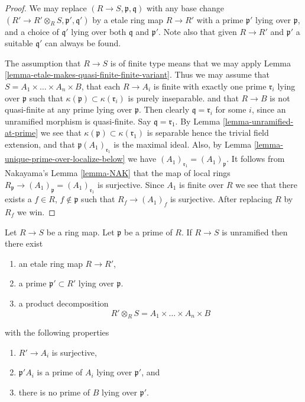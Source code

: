 \begin{proof}
We may replace $(R \to S, \mathfrak p, \mathfrak q)$
with any base change $(R' \to R'\otimes_R S, \mathfrak p', \mathfrak q')$
by a etale ring map $R \to R'$ with a prime $\mathfrak p'$
lying over $\mathfrak p$, and a choice of $\mathfrak q'$ lying over
both $\mathfrak q$ and $\mathfrak p'$. Note also that given
$R \to R'$ and $\mathfrak p'$ a suitable $\mathfrak q'$ can always
be found.

\medskip\noindent
The assumption that $R \to S$ is of finite type means that we may apply
Lemma \ref{lemma-etale-makes-quasi-finite-finite-variant}. Thus we may
assume that $S = A_1 \times \ldots \times A_n \times B$, that
each $R \to A_i$ is finite with exactly one prime $\mathfrak r_i$
lying over $\mathfrak p$ such that
$\kappa(\mathfrak p) \subset \kappa(\mathfrak r_i)$ is purely inseparable.
and that $R \to B$ is not quasi-finite at any prime lying over $\mathfrak p$.
Then clearly $\mathfrak q = \mathfrak r_i$ for some $i$, since
an unramified morphism is quasi-finite. Say $\mathfrak q = \mathfrak r_1$.
By Lemma \ref{lemma-unramified-at-prime} we see that
$\kappa(\mathfrak p) \subset \kappa(\mathfrak r_1)$
is separable hence the trivial field extension, and that
$\mathfrak p(A_1)_{\mathfrak r_1}$ is the maximal ideal.
Also, by Lemma \ref{lemma-unique-prime-over-localize-below}
we have $(A_1)_{\mathfrak r_1} = (A_1)_{\mathfrak p}$.
It follows from Nakayama's Lemma \ref{lemma-NAK}
that the map of local rings
$R_{\mathfrak p} \to (A_1)_{\mathfrak p} = (A_1)_{\mathfrak r_1}$
is surjective. Since $A_1$ is finite over $R$ we see that there
exists a $f \in R$, $f \not \in \mathfrak p$ such that
$R_f \to (A_1)_f$ is surjective. After replacing $R$ by $R_f$ we win.
\end{proof}

\begin{lemma}
\label{lemma-etale-makes-unramfied-closed}
Let $R \to S$ be a ring map.
Let $\mathfrak p$ be a prime of $R$.
If $R \to S$ is unramified then there exist
\begin{enumerate}
\item an etale ring map $R \to R'$,
\item a prime $\mathfrak p' \subset R'$ lying over $\mathfrak p$.
\item a product decomposition
$$
R' \otimes_R S = A_1 \times \ldots \times A_n \times B
$$
\end{enumerate}
with the following properties
\begin{enumerate}
\item $R' \to A_i$ is surjective,
\item $\mathfrak p'A_i$ is a prime of $A_i$ lying over $\mathfrak p'$, and
\item there is no prime of $B$ lying over $\mathfrak p'$.
\end{enumerate}
\end{lemma}

